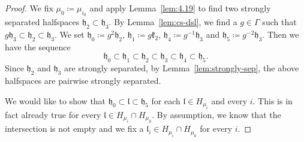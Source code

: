 \begin{proof}
  We fix \(\mu_0\coloneqq \mu_{i_0}\) and apply Lemma~\ref{lem:4.19} to find two strongly separated halfspaces \(\mathfrak{h}_2 \subset \mathfrak{h}_3\). By Lemma~\ref{lem:cs-dsl}, we find a \(g \in \Gamma\) such that \(g\mathfrak{h}_3 \subset \mathfrak{h}_2 \subset \mathfrak{h}_3\). We set \(\mathfrak{h}_0 \coloneqq g^2 \mathfrak{h}_2\), \(\mathfrak{h}_1 \coloneqq g\mathfrak{k}_2\), \(\mathfrak{h}_4 \coloneqq g^{-1}\mathfrak{h}_3\) and \(\mathfrak{h}_5 \coloneqq g^{-2} \mathfrak{h}_3\). Then we have the sequence
  \[
    \mathfrak{h}_0 \subset \mathfrak{h}_1 \subset \mathfrak{h}_2 \subset \mathfrak{h}_3 \subset \mathfrak{h}_4 \subset \mathfrak{h}_5.
  \]
  Since \(\mathfrak{h}_2\) and \(\mathfrak{h}_3\) are strongly separated, by Lemma~\ref{lem:strongly-sep}, the above halfspaces are pairwise strongly separated.

  We would like to show that \(\mathfrak{h}_0 \subset \mathfrak{l} \subset \mathfrak{h}_5\) for each \(\mathfrak{l} \in H_{\mu_i}\) and every \(i\). This is in fact already true for every \(\mathfrak{l} \in H_{\mu_i} \cap H_{\mu_0}\). By assumption, we know that the intersection is not empty and we fix a \(\mathfrak{l}_i \in H_{\mu_i} \cap H_{\mu_0}\) for every \(i\).


\end{proof}
